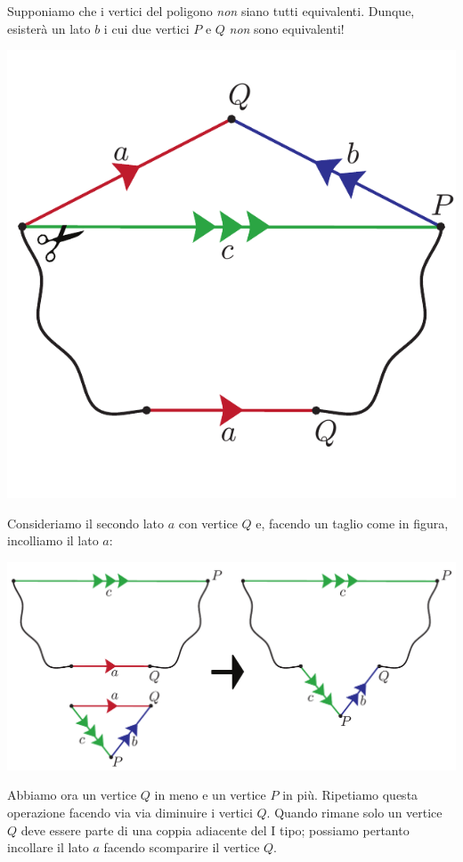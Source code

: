 \begin{demonstration}
Supponiamo che i vertici del poligono \textit{non} siano tutti equivalenti. Dunque, esisterà un lato $b$ i cui due vertici $P$ e $Q$ \textit{non} sono equivalenti!
\begin{center}
	\includegraphics[trim=0cm 0cm 0cm 0cm, clip, scale=0.35]{images/cutandpastealgorithmstep2-1.pdf}
\end{center}
Consideriamo il secondo lato $a$ con vertice $Q$ e, facendo un taglio come in figura, incolliamo il lato $a$:
\begin{center}
	\includegraphics[trim=0cm 0cm 0cm 0cm, clip, scale=0.35]{images/cutandpastealgorithmstep2-2.pdf}
\end{center}
Abbiamo ora un vertice $Q$ in meno e un vertice $P$ in più. Ripetiamo questa operazione facendo via via diminuire i vertici $Q$. Quando rimane solo un vertice $Q$ deve essere parte di una coppia adiacente del I tipo; possiamo pertanto incollare il lato $a$ facendo scomparire il vertice $Q$.\\

\end{demonstration}
